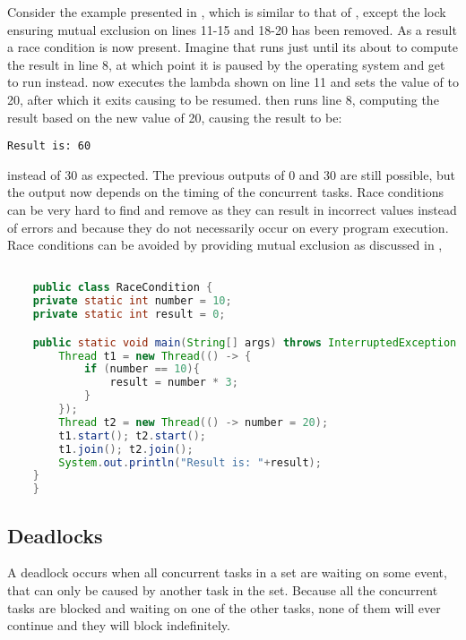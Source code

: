 Consider the example presented in , which is similar to that of , except the lock ensuring mutual exclusion on lines 11-15 and 18-20 has been removed. As a result a race condition is now present. Imagine that  runs just until its about to compute the result in line 8, at which point it is paused by the operating system and  get to run instead.  now executes the lambda shown on line 11 and sets the value of  to 20, after which it exits causing  to be resumed.  then runs line 8, computing the result based on the new  value of 20, causing the result to be:
\begin{verbatim}
Result is: 60
\end{verbatim}
instead of 30 as expected. The previous outputs of 0 and 30 are still possible, but the output now depends on the timing of the concurrent tasks. Race conditions can be very hard to find and remove as they can result in incorrect values instead of errors and because they do not necessarily occur on every program execution. Race conditions can be avoided by providing mutual exclusion as discussed in ,
\begin{lstlisting}[float,label=lst:racecondition,
  caption={Race condition example},
  language=Java,  
  showspaces=false,
  showtabs=false,
  breaklines=true,
  showstringspaces=false,
  breakatwhitespace=true,
  commentstyle=\color{greencomments},
  keywordstyle=\color{bluekeywords},
  stringstyle=\color{redstrings}]  % Start your code-block

	public class RaceCondition {
    private static int number = 10;
    private static int result = 0;

    public static void main(String[] args) throws InterruptedException {
        Thread t1 = new Thread(() -> {
            if (number == 10){
                result = number * 3;
            }
        });
        Thread t2 = new Thread(() -> number = 20);
        t1.start(); t2.start();
        t1.join(); t2.join();
        System.out.println("Result is: "+result);
    }
	}
\end{lstlisting}
 
\subsection{Deadlocks}
A deadlock occurs when all concurrent tasks in a set are waiting on some event, that can only be caused by another task in the set\cite[p. 435]{tanenbaum2008modern}. Because all the concurrent tasks are blocked and waiting on one of the other tasks, none of them will ever continue and they will block indefinitely.

